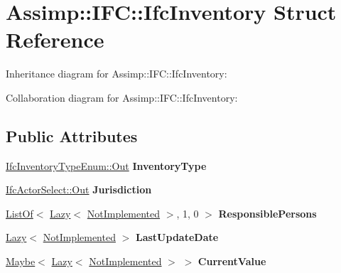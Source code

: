 \hypertarget{struct_assimp_1_1_i_f_c_1_1_ifc_inventory}{\section{Assimp\+:\+:I\+F\+C\+:\+:Ifc\+Inventory Struct Reference}
\label{struct_assimp_1_1_i_f_c_1_1_ifc_inventory}
}


Inheritance diagram for Assimp\+:\+:I\+F\+C\+:\+:Ifc\+Inventory\+:


Collaboration diagram for Assimp\+:\+:I\+F\+C\+:\+:Ifc\+Inventory\+:
\subsection*{Public Attributes}
\begin{DoxyCompactItemize}
\item 
\hypertarget{struct_assimp_1_1_i_f_c_1_1_ifc_inventory_a97af6cb6be3b74fbffccdda1a992b942}{\hyperlink{classboost_1_1shared__ptr}{Ifc\+Inventory\+Type\+Enum\+::\+Out} {\bfseries Inventory\+Type}}\label{struct_assimp_1_1_i_f_c_1_1_ifc_inventory_a97af6cb6be3b74fbffccdda1a992b942}

\item 
\hypertarget{struct_assimp_1_1_i_f_c_1_1_ifc_inventory_a9fe2d4b7c6f49558054e6cb50b115049}{\hyperlink{classboost_1_1shared__ptr}{Ifc\+Actor\+Select\+::\+Out} {\bfseries Jurisdiction}}\label{struct_assimp_1_1_i_f_c_1_1_ifc_inventory_a9fe2d4b7c6f49558054e6cb50b115049}

\item 
\hypertarget{struct_assimp_1_1_i_f_c_1_1_ifc_inventory_a9d4d197bafb9cb80d76b99b73391ab19}{\hyperlink{struct_assimp_1_1_s_t_e_p_1_1_list_of}{List\+Of}$<$ \hyperlink{struct_assimp_1_1_s_t_e_p_1_1_lazy}{Lazy}$<$ \hyperlink{struct_assimp_1_1_i_f_c_1_1_not_implemented}{Not\+Implemented} $>$, 1, 0 $>$ {\bfseries Responsible\+Persons}}\label{struct_assimp_1_1_i_f_c_1_1_ifc_inventory_a9d4d197bafb9cb80d76b99b73391ab19}

\item 
\hypertarget{struct_assimp_1_1_i_f_c_1_1_ifc_inventory_a36ad7541854f4901b0f3db0bac50bae0}{\hyperlink{struct_assimp_1_1_s_t_e_p_1_1_lazy}{Lazy}$<$ \hyperlink{struct_assimp_1_1_i_f_c_1_1_not_implemented}{Not\+Implemented} $>$ {\bfseries Last\+Update\+Date}}\label{struct_assimp_1_1_i_f_c_1_1_ifc_inventory_a36ad7541854f4901b0f3db0bac50bae0}

\item 
\hypertarget{struct_assimp_1_1_i_f_c_1_1_ifc_inventory_acdf47f3a028b7728168168cbf6ae11de}{\hyperlink{struct_assimp_1_1_s_t_e_p_1_1_maybe}{Maybe}$<$ \hyperlink{struct_assimp_1_1_s_t_e_p_1_1_lazy}{Lazy}$<$ \hyperlink{struct_assimp_1_1_i_f_c_1_1_not_implemented}{Not\+Implemented} $>$ $>$ {\bfseries Current\+Value}}\label{struct_assimp_1_1_i_f_c_1_1_ifc_inventory_acdf47f3a028b7728168168cbf6ae11de}


\end{DoxyCompactItemize}
